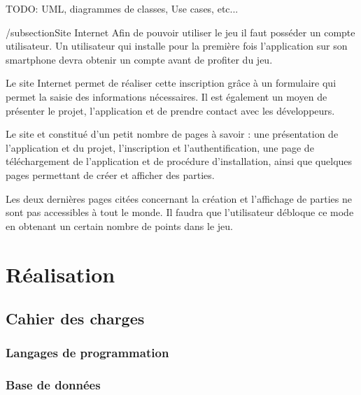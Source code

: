 \documentclass[a4paper,11pt,french]{article}
\begin{document}

TODO: UML, diagrammes de classes, Use cases, etc...

/subsection{Site Internet}
Afin de pouvoir utiliser le jeu il faut posséder un compte utilisateur. Un utilisateur qui installe pour la première fois l'application sur son smartphone devra obtenir un compte avant de profiter du jeu.

Le site Internet permet de réaliser cette inscription grâce à un formulaire qui permet la saisie des informations nécessaires. Il est également un moyen de présenter le projet, l'application et de prendre contact avec les développeurs.

Le site et constitué d'un petit nombre de pages à savoir : une présentation de l'application et du projet, l'inscription et l'authentification, une page de téléchargement de l'application et de procédure d'installation, ainsi que quelques pages permettant de créer et afficher des parties.

Les deux dernières pages citées concernant la création et l'affichage de parties ne sont pas accessibles à tout le monde. Il faudra que l'utilisateur débloque ce mode en obtenant un certain nombre de points dans le jeu.



\section{Réalisation}
\subsection{Cahier des charges}




\subsubsection{Langages de programmation}



\subsubsection{Base de données}
\end{document}
